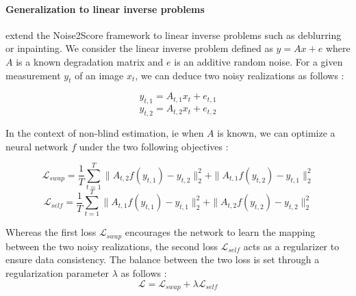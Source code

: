 \paragraph{Generalization to linear inverse problems}

 extend the Noise2Score framework to linear inverse problems such as deblurring or inpainting. We consider the linear inverse problem defined as $y = A x + e$ where $A$ is a known degradation matrix and $e$ is an additive random noise.
For a given measurement $y_t$ of an image $x_t$, we can deduce two noisy realizations as follows :

\begin{equation}
    y_{t,1} = A_{t, 1} x_t + e_{t,1}
\end{equation}
\begin{equation}
    y_{t,2} = A_{t, 2} x_t + e_{t,2}
\end{equation}

In the context of non-blind estimation, ie when $A$ is known, we can optimize a neural network $f$ under the two following objectives :

\begin{equation}
    \mathcal{L}_{swap} = \frac{1}{T} \sum_{t=1}^T \| A_{t,2} f(y_{t,1}) - y_{t,2} \|_2^2 + \| A_{t,1} f(y_{t,2}) - y_{t,1} \|_2^2
\end{equation}
\begin{equation}
    \mathcal{L}_{self} = \frac{1}{T} \sum_{t=1}^T \| A_{t,1} f(y_{t,1}) - y_{t,1} \|_2^2 + \| A_{t,2} f(y_{t,2}) - y_{t,2} \|_2^2
\end{equation}

Whereas the first loss $\mathcal{L}_{swap}$ encourages the network to learn the mapping between the two noisy realizations, the second loss $\mathcal{L}_{self}$ acts as a regularizer to ensure data consistency. The balance between the two loss is set through a regularization parameter $\lambda$ as follows :
\begin{equation}
    \mathcal{L} = \mathcal{L}_{swap} + \lambda \mathcal{L}_{self}
\end{equation}